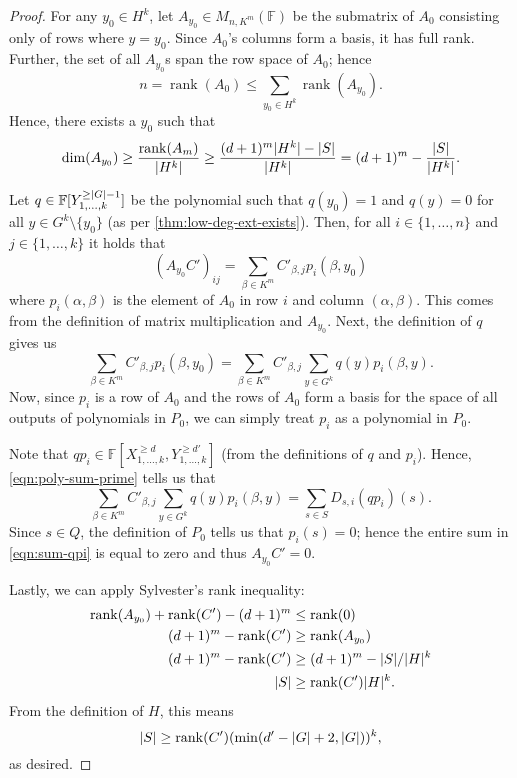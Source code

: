 \documentclass[english,12pt]{reedthesis}
\theoremstyle{plain}
\theoremstyle{definition}
\theoremstyle{remark}
\DeclareMathOperator{\rk}{rank}
\DeclarePairedDelimiter{\abs}{\lvert}{\rvert}
\begin{document}
\begin{proof}
  For any $y_{0} \in H^{k}$, let $A_{y_{0}} \in M_{n,K^{m}}(\mathbb{F})$ be the
  submatrix of $A_{0}$ consisting only of rows where $y = y_{0}$.
  Since $A_{0}$'s columns form a basis, it has full rank. Further, the set of
  all $A_{y_{0}}$s span the row space of $A_{0}$; hence
  \[
    n = \rk(A_{0}) \le \sum_{y_{0} \in H^{k}}\rk(A_{y_{0}}).
  \]
  Hence, there exists a $y_{0}$ such that
  \[
    \dim(A_{y_{0}}) \ge \frac{\rk(A_{m})}{\abs{H^{k}}}
    \ge \frac{(d+1)^{m}\abs{H^{k}} - \abs{S}}{\abs{H^{k}}} = (d+1)^{m} - \frac{\abs{S}}{\abs{H^{k}}}.
  \]

  Let $q \in \mathbb{F}[Y_{1, \ldots, k}^{\ge \abs{G} - 1}]$ be the polynomial such that
  $q(y_{0}) = 1$ and $q(y) = 0$ for all $y \in G^{k} \setminus \{y_{0}\}$ (as per
  \cref{thm:low-deg-ext-exists}). Then, for all $i \in \{1, \ldots, n\}$ and
  $j \in \{1, \ldots, k\}$ it holds that
  \begin{equation}
    (A_{y_{0}}C')_{ij} = \sum_{\beta \in K^{m}}C'_{\beta,j}p_{i}(\beta, y_{0})
  \end{equation}
  where $p_{i}(\alpha, \beta)$ is the element of $A_{0}$ in row $i$ and column $(\alpha,\beta)$.
  This comes from the definition of matrix multiplication and $A_{y_{0}}$. Next,
  the definition of $q$ gives us
  \begin{equation}
    \sum_{\beta \in K^{m}}C'_{\beta,j}p_{i}(\beta, y_{0}) = \sum_{\beta \in K^{m}}C'_{\beta,j}\sum_{y \in G^{k}}q(y)p_{i}(\beta,y).
  \end{equation}
  Now, since $p_{i}$ is a row of $A_{0}$ and the rows of $A_{0}$ form a basis
  for the space of all outputs of polynomials in $P_{0}$, we can simply treat
  $p_{i}$ as a polynomial in $P_{0}$.

  Note that $qp_{i} \in \mathbb{F}[X_{1, \ldots, k}^{\ge d}, Y_{1, \ldots, k}^{\ge d'}]$ (from
  the definitions of $q$ and $p_{i}$). Hence, \cref{eqn:poly-sum-prime} tells us
  that
  \begin{equation}\label{eqn:sum-qpi}
    \sum_{\beta \in K^{m}}C'_{\beta,j}\sum_{y \in G^{k}}q(y)p_{i}(\beta,y) = \sum_{s \in S}D_{s,i}(qp_{i})(s).
  \end{equation}
  Since $s \in Q$, the definition of $P_{0}$ tells us that $p_{i}(s) = 0$; hence
  the entire sum in \cref{eqn:sum-qpi} is equal to zero and thus
  $A_{y_{0}}C' = 0$.

  Lastly, we can apply Sylvester's rank inequality:
  \begin{align*}
    \rk(A_{y_{0}}) + \rk(C') - (d+1)^{m} &\le \rk(0) \\
    (d+1)^{m} - \rk(C') &\ge \rk(A_{y_{0}}) \\
    (d+1)^{m} - \rk(C') &\ge (d+1)^{m} - \abs{S}/\abs{H}^{k} \\
    \abs{S} &\ge \rk(C')\abs{H}^{k}.
  \end{align*}
  From the definition of $H$, this means
  \[
    \abs{S} \ge \rk(C')(\min(d' - \abs{G} + 2, \abs{G}))^{k},
  \]
  as desired.
\end{proof}
\end{document}
